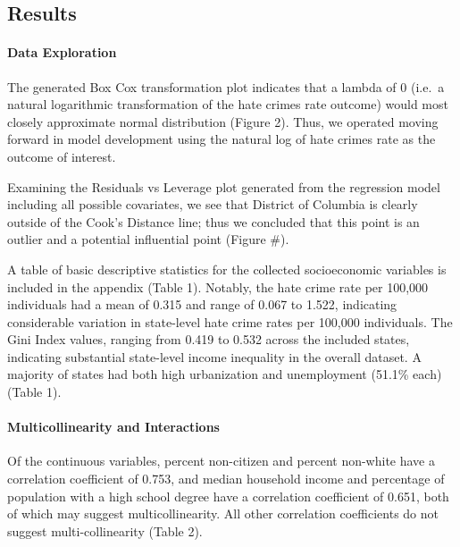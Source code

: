 \documentclass[
]{article}
\begin{document}
\hypertarget{results}{%
\subsection{Results}\label{results}}

\hypertarget{data-exploration-1}{%
\paragraph{Data Exploration}\label{data-exploration-1}}

The generated Box Cox transformation plot indicates that a lambda of 0
(i.e.~a natural logarithmic transformation of the hate crimes rate
outcome) would most closely approximate normal distribution (Figure 2).
Thus, we operated moving forward in model development using the natural
log of hate crimes rate as the outcome of interest.

Examining the Residuals vs Leverage plot generated from the regression
model including all possible covariates, we see that District of
Columbia is clearly outside of the Cook's Distance line; thus we
concluded that this point is an outlier and a potential influential
point (Figure \#).

A table of basic descriptive statistics for the collected socioeconomic
variables is included in the appendix (Table 1). Notably, the hate crime
rate per 100,000 individuals had a mean of 0.315 and range of 0.067 to
1.522, indicating considerable variation in state-level hate crime rates
per 100,000 individuals. The Gini Index values, ranging from 0.419 to
0.532 across the included states, indicating substantial state-level
income inequality in the overall dataset. A majority of states had both
high urbanization and unemployment (51.1\% each) (Table 1).

\hypertarget{multicollinearity-and-interactions-1}{%
\paragraph{Multicollinearity and
Interactions}\label{multicollinearity-and-interactions-1}}

Of the continuous variables, percent non-citizen and percent non-white
have a correlation coefficient of 0.753, and median household income and
percentage of population with a high school degree have a correlation
coefficient of 0.651, both of which may suggest multicollinearity. All
other correlation coefficients do not suggest multi-collinearity (Table
2).
\end{document}
